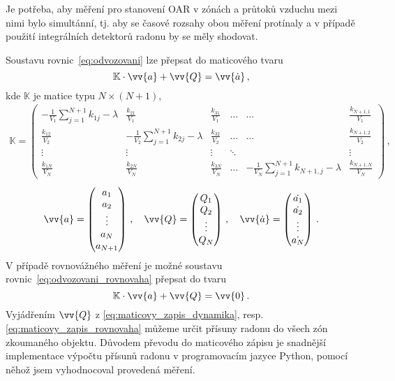 Je potřeba, aby měření pro stanovení OAR v zónách a průtoků vzduchu mezi nimi bylo simultánní, tj. aby se časové rozsahy obou měření protínaly a v případě použití integrálních detektorů radonu by se měly shodovat.

Soustavu rovnic~\eqref{eq:odvozovani} lze přepsat do maticového tvaru
\begin{equation}
    \mathbb{K}\cdot\vv{a}+\vv{Q}=\vv{\dot{a}}\,,
    \label{eq:maticovy_zapis_dynamika}
\end{equation}
kde $\mathbb{K}$ je matice typu $N\times(N+1)$,
\begin{align}
    \mathbb{K}=\begin{pmatrix}
        -\frac{1}{V_1}\sum_{j=1}^{N+1}k_{1j}-\lambda& \frac{k_{21}}{V_1} & \frac{k_{31}}{V_1}& \dots& \dots& \frac{k_{N+1,1}}{V_1}\\
        \frac{k_{12}}{V_2}&-\frac{1}{V_2}\sum_{j=1}^{N+1}k_{2j}-\lambda& \frac{k_{32}}{V_2}&\dots&\dots&\frac{k_{N+1,2}}{V_2}\\
        \vdots&\vdots&\vdots&\ddots&&\vdots\\
        \frac{k_{1N}}{V_N}&\frac{k_{2N}}{V_N}&\frac{k_{3N}}{V_N}&\dots&-\frac{1}{V_N}\sum_{j=1}^{N+1}k_{N+1,j}-\lambda&\frac{k_{N+1,N}}{V_N}
    \end{pmatrix}\,,
\end{align}
\begin{align}
    \vv{a}=\begin{pmatrix}
        a_1\\
        a_2\\
        \vdots\\
        a_N\\
        a_{N+1}
    \end{pmatrix}\,,\quad 
    \vv{Q}=\begin{pmatrix}
        Q_1\\
        Q_2\\
        \vdots\\
        Q_N
    \end{pmatrix}\,,\quad
    \vv{\dot{a}}=\begin{pmatrix}
        \dot{a_1}\\
        \dot{a_2}\\
        \vdots\\
        \dot{a_N}
    \end{pmatrix}\,. 
\end{align}
V případě rovnovážného měření je možné soustavu rovnic~\eqref{eq:odvozovani_rovnovaha} přepsat do tvaru
\begin{equation}
    \mathbb{K}\cdot\vv{a}+\vv{Q}=\vv{0}\,.
    \label{eq:maticovy_zapis_rovnovaha}
\end{equation}
Vyjádřením $\vv{Q}$ z \eqref{eq:maticovy_zapis_dynamika}, resp. \eqref{eq:maticovy_zapis_rovnovaha} můžeme určit přísuny radonu do všech zón zkoumaného objektu. Důvodem převodu do maticového zápisu je snadnější implementace výpočtu přísunů radonu v programovacím jazyce Python, pomocí něhož jsem vyhodnocoval provedená měření. 

